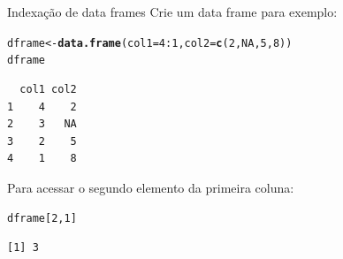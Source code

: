 \documentclass[10pt,handout]{beamer}\usepackage[]{graphicx}\usepackage[]{color}
\makeatletter
\newcommand{\hlnum}[1]{\textcolor[rgb]{0.686,0.059,0.569}{#1}}%
\newcommand{\hlopt}[1]{\textcolor[rgb]{0,0,0}{#1}}%
\newcommand{\hlstd}[1]{\textcolor[rgb]{0.345,0.345,0.345}{#1}}%
\newcommand{\hlkwb}[1]{\textcolor[rgb]{0.69,0.353,0.396}{#1}}%
\newcommand{\hlkwc}[1]{\textcolor[rgb]{0.333,0.667,0.333}{#1}}%
\newcommand{\hlkwd}[1]{\textcolor[rgb]{0.282,0.239,0.545}{\textbf{#1}}}%
\newenvironment{kframe}{%
 \def\at@end@of@kframe{}%
 \ifinner\ifhmode%
  \def\at@end@of@kframe{\end{minipage}}%
  \begin{minipage}{\columnwidth}%
 \fi\fi%
 \def\FrameCommand##1{\hskip\@totalleftmargin \hskip-\fboxsep
 \colorbox{shadecolor}{##1}\hskip-\fboxsep
     \hskip-\linewidth \hskip-\@totalleftmargin \hskip\columnwidth}%
 \MakeFramed {\advance\hsize-\width
   \@totalleftmargin\z@ \linewidth\hsize
   \@setminipage}}%
 {\par\unskip\endMakeFramed%
 \at@end@of@kframe}
\newenvironment{knitrout}{}{} %
\makeatother
\begin{document}
\begin{frame}[fragile]{Indexação de data frames}
Crie um data frame para exemplo:
\begin{knitrout}\small
{}\color{fgcolor}\begin{kframe}
\begin{alltt}
\hlstd{dframe} \hlkwb{<-} \hlkwd{data.frame}\hlstd{(}\hlkwc{col1} \hlstd{=} \hlnum{4}\hlopt{:}\hlnum{1}\hlstd{,} \hlkwc{col2} \hlstd{=} \hlkwd{c}\hlstd{(}\hlnum{2}\hlstd{,}\hlnum{NA}\hlstd{,}\hlnum{5}\hlstd{,}\hlnum{8}\hlstd{))}
\hlstd{dframe}
\end{alltt}
\begin{verbatim}
  col1 col2
1    4    2
2    3   NA
3    2    5
4    1    8
\end{verbatim}
\end{kframe}
\end{knitrout}

Para acessar o segundo elemento da primeira coluna:
\begin{knitrout}\small
{}\color{fgcolor}\begin{kframe}
\begin{alltt}
\hlstd{dframe[}\hlnum{2}\hlstd{,}\hlnum{1}\hlstd{]}
\end{alltt}
\begin{verbatim}
[1] 3
\end{verbatim}
\end{kframe}
\end{knitrout}

\end{frame}
\end{document}
